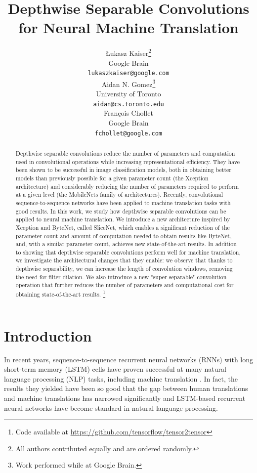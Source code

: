 \documentclass{article}
\title{Depthwise Separable Convolutions for Neural Machine Translation}
\author{
  {\L}ukasz Kaiser\thanks{All authors contributed equally and are ordered randomly.}\\
  Google Brain\\
  \texttt{lukaszkaiser@google.com} \\
  \And
  Aidan N. Gomez\samethanks[1]\hspace{1.7mm}\thanks{Work performed while at Google Brain.}\\
  University of Toronto\\
  \texttt{aidan@cs.toronto.edu} \\
  \And
  Fran\c{c}ois Chollet\samethanks[1]\\
  Google Brain\\
  \texttt{fchollet@google.com} \\
}
\newcommand\blfootnote[1]{%
  \begingroup
  \renewcommand\thefootnote{}\footnote{#1}%
  \addtocounter{footnote}{-1}%
  \endgroup
}
\begin{document}
\maketitle

\begin{abstract}
Depthwise separable convolutions reduce the number of parameters and computation used in convolutional operations while increasing representational efficiency.
They have been shown to be successful in image classification models, both in obtaining better models than previously possible for a given parameter count (the Xception architecture) and considerably reducing the number of parameters required to perform at a given level (the MobileNets family of architectures). Recently, convolutional sequence-to-sequence networks have been applied to machine translation tasks with good results. In this work, we study how depthwise separable convolutions can be applied to neural machine translation. We introduce a new architecture inspired by Xception and ByteNet, called SliceNet, which enables a significant reduction of the parameter count and amount of computation needed to obtain results like ByteNet, and, with a similar parameter count, achieves new state-of-the-art results.
In addition to showing that depthwise separable convolutions perform well for machine translation, we investigate the architectural changes that they enable: we observe that thanks to depthwise separability, we can increase the length of convolution windows, removing the need for filter dilation. We also introduce a new "super-separable" convolution operation that further reduces the number of parameters and computational cost for obtaining state-of-the-art results.
\blfootnote{Code available at \url{https://github.com/tensorflow/tensor2tensor}}
\end{abstract}

\section{Introduction}

In recent years, sequence-to-sequence recurrent neural networks (RNNs) with long short-term memory (LSTM) cells \citep{hochreiter1997}
have proven successful at many natural language processing (NLP) tasks, including machine translation
\citep{sutskever14,bahdanau2014neural,cho2014learning}. In fact, the results they yielded have been so good that
the gap between human translations and machine translations has narrowed significantly \cite{GNMT} and LSTM-based recurrent
neural networks have become standard in natural language processing.
\end{document}
